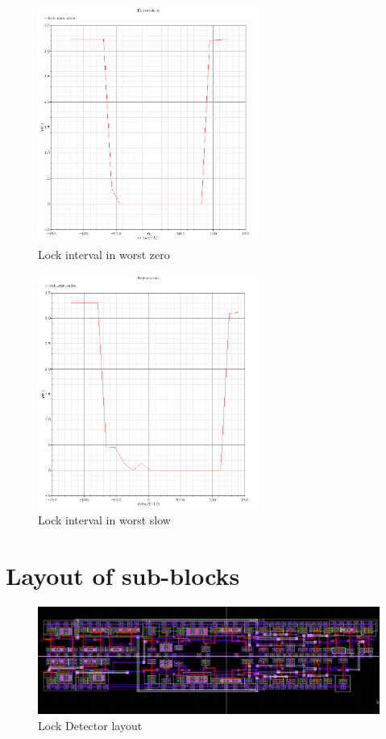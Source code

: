 \documentclass[a4paper,12pt]{article} \usepackage{graphicx}
\begin{document}
\begin{figure}[h]
  \centering
  \includegraphics[width=0.65\textwidth]{../Bilder/LD_tran/LD_lsim_wz.png}
  \caption{Lock interval in worst zero}
  \label{fig:LDwz}
\end{figure}

\begin{figure}[h]
  \centering
  \includegraphics[width=0.65\textwidth]{../Bilder/LD_tran/LD_lsim_ws.png}
  \caption{Lock interval in worst slow}
  \label{fig:LDws}
\end{figure}

\section{Layout of sub-blocks}
\label{sec:Layout}

\begin{figure}[h]
  \centering
  \includegraphics[width=1.0\textwidth]{../Bilder/Layout/lock_detector.png}
  \caption{Lock Detector layout}
  \label{fig:LD}
\end{figure}
\end{document}
